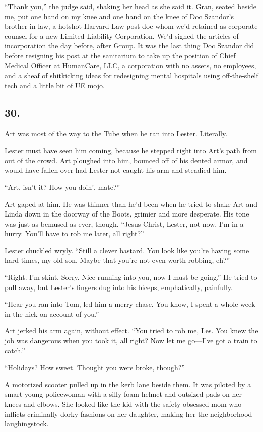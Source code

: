 “Thank you,” the judge said, shaking her head as she said it. Gran,
seated beside me, put one hand on my knee and one hand on the knee
of Doc Szandor’s brother-in-law, a hotshot Harvard Law post-doc
whom we’d retained as corporate counsel for a new Limited Liability
Corporation. We’d signed the articles of incorporation the day
before, after Group. It was the last thing Doc Szandor did before
resigning his post at the sanitarium to take up the position of
Chief Medical Officer at HumanCare, LLC, a corporation with no
assets, no employees, and a sheaf of shitkicking ideas for
redesigning mental hospitals using off-the-shelf tech and a little
bit of UE mojo.

\subsection{30.}

Art was most of the way to the Tube when he ran into Lester.
Literally.

Lester must have seen him coming, because he stepped right into
Art’s path from out of the crowd. Art ploughed into him, bounced
off of his dented armor, and would have fallen over had Lester not
caught his arm and steadied him.

“Art, isn’t it? How you doin’, mate?”

Art gaped at him. He was thinner than he’d been when he tried to
shake Art and Linda down in the doorway of the Boots, grimier and
more desperate. His tone was just as bemused as ever, though.
“Jesus Christ, Lester, not now, I’m in a hurry. You’ll have to rob
me later, all right?”

Lester chuckled wryly. “Still a clever bastard. You look like
you’re having some hard times, my old son. Maybe that you’re not
even worth robbing, eh?”

“Right. I’m skint. Sorry. Nice running into you, now I must be
going.” He tried to pull away, but Lester’s fingers dug into his
biceps, emphatically, painfully.

“Hear you ran into Tom, led him a merry chase. You know, I spent a
whole week in the nick on account of you.”

Art jerked his arm again, without effect. “You tried to rob me,
Les. You knew the job was dangerous when you took it, all right?
Now let me go—I’ve got a train to catch.”

“Holidays? How sweet. Thought you were broke, though?”

A motorized scooter pulled up in the kerb lane beside them. It was
piloted by a smart young policewoman with a silly foam helmet and
outsized pads on her knees and elbows. She looked like the kid with
the safety-obsessed mom who inflicts criminally dorky fashions on
her daughter, making her the neighborhood laughingstock.

